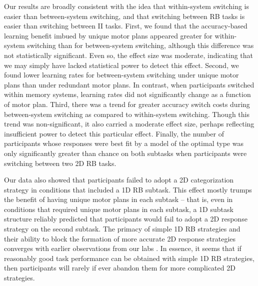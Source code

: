 \documentclass[doc, floatsintext]{apa7}
\begin{document}
Our results are broadly consistent with the idea that
within-system switching is easier than between-system
switching, and that switching between RB tasks is easier
than switching between II tasks. First, we found that the
accuracy-based learning benefit imbued by unique motor plans
appeared greater for within-system switching than for
between-system switching, although this difference was not
statistically significant. Even so, the effect size was
moderate, indicating that we may simply have lacked
statistical power to detect this effect.  Second, we found
lower learning rates for between-system switching under
unique motor plans than under redundant motor plans. In
contrast, when participants switched within memory systems,
learning rates did not significantly change as a function of
motor plan. Third, there was a trend for greater accuracy
switch costs during between-system switching as compared to
within-system switching. Though this trend was
non-significant, it also carried a moderate effect size,
perhaps reflecting insufficient power to detect this
particular effect. Finally, the number of participants whose
responses were best fit by a model of the optimal type was
only significantly greater than chance on both subtasks when
participants were switching between two 2D RB tasks.

Our data also showed that participants failed to adopt a 2D
categorization strategy in conditions that included a 1D RB
subtask. This effect mostly trumps the benefit of having
unique motor plans in each subtask -- that is, even in
conditions that required unique motor plans in each subtask,
a 1D subtask structure reliably predicted that participants
would fail to adopt a 2D response strategy on the second
subtask. The primacy of simple 1D RB strategies and their
ability to block the formation of more accurate 2D response
strategies converges with earlier observations from our labs
\cite{gregory_ashby_interactions_2010}. In essence, it seems
that if reasonably good task performance can be obtained
with simple 1D RB strategies, then participants will rarely
if ever abandon them for more complicated 2D strategies.
\end{document}
